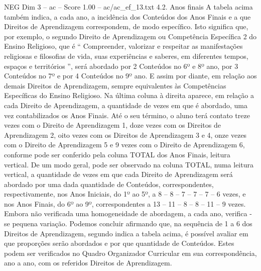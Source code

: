\begin{textsample}{NEG Dim 3 – ac – Score 1.00 – ac/ac\_ef\_13.txt}  \label{ex:f3_neg_264}
4.2.
Anos finais A tabela acima também indica, a cada ano, a incidência dos Conteúdos dos Anos Finais e a que Direitos de Aprendizagem correspondem, de modo específico.
Isto significa que, por exemplo, o segundo Direito de Aprendizagem ou Competência Específica 2 do Ensino Religioso, que é “ Compreender, valorizar e respeitar as manifestações religiosas e filosofias de vida, suas experiências e saberes, em diferentes tempos, espaços e territórios ”, será abordado por 2 Conteúdos no 6º e 8º ano, por 3 Conteúdos no 7º e por 4 Conteúdos no 9º ano.
E assim por diante, em relação aos demais Direitos de Aprendizagem, sempre equivalentes às Competências Específicas do Ensino Religioso.
Na última coluna à direita aparece, em relação a cada Direito de Aprendizagem, a quantidade de vezes em que é abordado, uma vez contabilizados os Anos Finais.
Até o seu término, o aluno terá contato treze vezes com o Direito de Aprendizagem 1, doze vezes com os Direitos de Aprendizagem 2, oito vezes com os Direitos de Aprendizagem 3 e 4, onze vezes com o Direito de Aprendizagem 5 e 9 vezes com o Direito de Aprendizagem 6, conforme pode ser conferido pela coluna TOTAL dos Anos Finais, leitura vertical.
De um modo geral, pode ser observado na coluna TOTAL, numa leitura vertical, a quantidade de vezes em que cada Direito de Aprendizagem será abordado por uma dada quantidade de Conteúdos, correspondentes, respectivamente, nos Anos Iniciais, do 1º ao 5º, a 8 – 8 – 7 – 7 – 7 – 6 vezes, e nos Anos Finais, do 6º ao 9º, correspondentes a 13 – 11 – 8 – 8 – 11 – 9 vezes.
Embora não verificada uma homogeneidade de abordagem, a cada ano, verifica -se pequena variação.
Podemos concluir afirmando que, na sequência de 1 a 6 dos Direitos de Aprendizagem, segundo indica a tabela acima, é possível avaliar em que proporções serão abordados e por que quantidade de Conteúdos.
Estes podem ser verificados no Quadro Organizador Curricular em sua correspondência, ano a ano, com os referidos Direitos de Aprendizagem.

\end{textsample}

